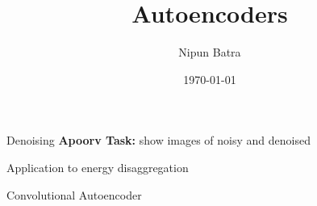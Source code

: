 \documentclass{beamer}
\title{Autoencoders}
\date{\today}
\author{Nipun Batra}
\institute{IIT Gandhinagar}
\newcommand{\red}[1]{{\color{red}\small \textbf{Apoorv Task:} #1}}
\begin{document}
\begin{frame}{Denoising}
\red{show images of noisy and denoised}
\end{frame}

\begin{frame}{Application to energy disaggregation}
\end{frame}


\begin{frame}{Convolutional Autoencoder}
\end{frame}
\end{document}
